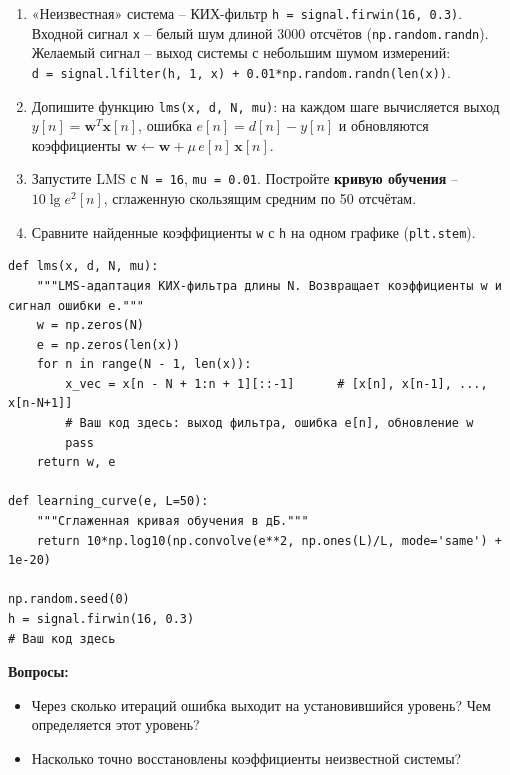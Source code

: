 \documentclass[12pt,a4paper,openany]{book}
\providecommand{\tightlist}{\setlength{\itemsep}{0pt}\setlength{\parskip}{0pt}}
\begin{document}
\begin{enumerate}
\def\labelenumi{\arabic{enumi}.}
\tightlist
\item
  «Неизвестная» система -- КИХ-фильтр \texttt{h\ =\allowbreak{}\ signal.\allowbreak{}firwin(\allowbreak{}16,\allowbreak{}\ 0.\allowbreak{}3)}. Входной сигнал \texttt{x} -- белый шум длиной 3000 отсчётов (\texttt{np.\allowbreak{}random.\allowbreak{}randn}). Желаемый сигнал -- выход системы с небольшим шумом измерений: \texttt{d\ =\allowbreak{}\ signal.\allowbreak{}lfilter(\allowbreak{}h,\allowbreak{}\ 1,\allowbreak{}\ x)\ +\ 0.\allowbreak{}01*np.\allowbreak{}random.\allowbreak{}randn(\allowbreak{}len(\allowbreak{}x))}.
\item
  Допишите функцию \texttt{lms(\allowbreak{}x,\allowbreak{}\ d,\allowbreak{}\ N,\allowbreak{}\ mu)}: на каждом шаге вычисляется выход \(y[n] = \mathbf{w}^T\mathbf{x}[n]\), ошибка \(e[n] = d[n] - y[n]\) и обновляются коэффициенты \(\mathbf{w} \leftarrow \mathbf{w} + \mu\,e[n]\,\mathbf{x}[n]\).
\item
  Запустите LMS с \texttt{N\ =\allowbreak{}\ 16}, \texttt{mu\ =\allowbreak{}\ 0.\allowbreak{}01}. Постройте \textbf{кривую обучения} -- \(10\lg e^2[n]\), сглаженную скользящим средним по 50 отсчётам.
\item
  Сравните найденные коэффициенты \texttt{w} с \texttt{h} на одном графике (\texttt{plt.\allowbreak{}stem}).
\end{enumerate}

\begin{Verbatim}[fontsize=\small, breaklines, breakanywhere, frame=single, framesep=2mm]
def lms(x, d, N, mu):
    """LMS-адаптация КИХ-фильтра длины N. Возвращает коэффициенты w и сигнал ошибки e."""
    w = np.zeros(N)
    e = np.zeros(len(x))
    for n in range(N - 1, len(x)):
        x_vec = x[n - N + 1:n + 1][::-1]      # [x[n], x[n-1], ..., x[n-N+1]]
        # Ваш код здесь: выход фильтра, ошибка e[n], обновление w
        pass
    return w, e

def learning_curve(e, L=50):
    """Сглаженная кривая обучения в дБ."""
    return 10*np.log10(np.convolve(e**2, np.ones(L)/L, mode='same') + 1e-20)

np.random.seed(0)
h = signal.firwin(16, 0.3)
# Ваш код здесь
\end{Verbatim}

\textbf{Вопросы:}

\begin{itemize}
\tightlist
\item
  Через сколько итераций ошибка выходит на установившийся уровень? Чем определяется этот уровень?
\item
  Насколько точно восстановлены коэффициенты неизвестной системы?
\end{itemize}
\end{document}
